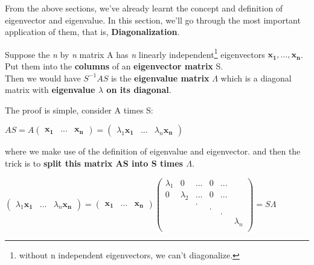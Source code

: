 \documentclass[12pt]{article}
\begin{document}
From the above sections, we've already learnt the concept and definition of eigenvector and eigenvalue. In this section, we'll go through the most important application of them, that is, \textbf{Diagonalization}.

\begin{center}
    Suppose the \textit{n} by \textit{n} matrix A has \textit{n} linearly independent\footnote{without n independent eigenvectors, we can't diagonalize.} eigenvectors $\mathbf{x_1, ..., x_n}$. 
    \\
    Put them into the \textbf{columns} of an \textbf{eigenvector matrix} S. 
    \\
    Then we would have $S^{-1} A S$ is the \textbf{eigenvalue matrix} $\Lambda$ which is a diagonal matrix with \textbf{eigenvalue $\lambda$ on its diagonal}.
\end{center}

The proof is simple, consider A times S:

\begin{center}
    $AS = A \begin{pmatrix}
                \mathbf{x_1} & ... & \mathbf{x_n}
            \end{pmatrix} = \begin{pmatrix}
                \lambda_1\mathbf{x_1} & ... & \lambda_n\mathbf{x_n}
            \end{pmatrix}$
\end{center}

where we make use of the definition of eigenvalue and eigenvector.
and then the trick is to \textbf{split this matrix AS into S times $\Lambda$}.

\begin{center}
    $\begin{pmatrix}
        \lambda_1\mathbf{x_1} & ... & \lambda_n\mathbf{x_n}
    \end{pmatrix} = \begin{pmatrix}
        \mathbf{x_1} & ... & \mathbf{x_n}
    \end{pmatrix} \begin{pmatrix}
        \lambda_1 & 0 & ... & 0 & ...\\
        0 & \lambda_2 & ... & 0 & ...\\
        \ &\ & . \\
        \ &\ & \ & .\\
        \ &\ & \ & \ &.\\
        \ &\ & \ & \ & \ & \lambda_n\\
    \end{pmatrix} = S\Lambda$
\end{center}
\end{document}

